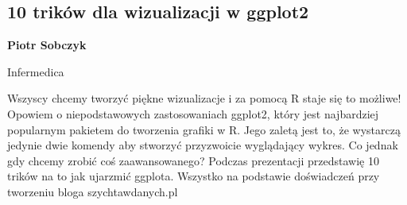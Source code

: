 \documentclass[\main/boa.tex]{subfiles}
\begin{document}
\subsection{10 trików dla wizualizacji w ggplot2 }

\begin{minipage}{0.915\textwidth}
	\centering
  {\bf {} Piotr Sobczyk}
\end{minipage}


\begin{affiliations}
\begin{minipage}{0.915\textwidth}
\centering
Infermedica  \\[-2pt]
\end{minipage}
\end{affiliations}

\vskip 0.3cm

 Wszyscy chcemy tworzyć piękne wizualizacje i za pomocą R staje się to możliwe! Opowiem o niepodstawowych zastosowaniach ggplot2, który jest najbardziej popularnym pakietem do tworzenia grafiki w R. Jego zaletą jest to, że wystarczą jedynie dwie komendy aby stworzyć przyzwoicie wyglądający wykres. Co jednak gdy chcemy zrobić coś zaawansowanego? Podczas prezentacji przedstawię 10 trików na to jak ujarzmić ggplota. Wszystko na podstawie doświadczeń przy tworzeniu bloga szychtawdanych.pl 
\end{document}
